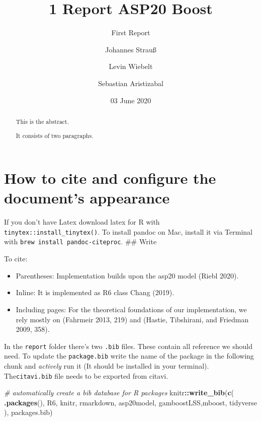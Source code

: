 \documentclass[
]{report}
\title{1 Report ASP20 Boost}
\subtitle{First Report}
\author{Johannes Strauß \and Levin Wiebelt \and Sebastian Aristizabal}
\date{03 June 2020}
\newenvironment{Shaded}{\begin{snugshade}}{\end{snugshade}}
\newcommand{\CommentTok}[1]{\textcolor[rgb]{0.56,0.35,0.01}{\textit{#1}}}
\newcommand{\KeywordTok}[1]{\textcolor[rgb]{0.13,0.29,0.53}{\textbf{#1}}}
\newcommand{\NormalTok}[1]{#1}
\newcommand{\OperatorTok}[1]{\textcolor[rgb]{0.81,0.36,0.00}{\textbf{#1}}}
\newcommand{\StringTok}[1]{\textcolor[rgb]{0.31,0.60,0.02}{#1}}
\providecommand{\tightlist}{%
  \setlength{\itemsep}{0pt}\setlength{\parskip}{0pt}}
\begin{document}
\maketitle
\begin{abstract}
This is the abstract.

It consists of two paragraphs.
\end{abstract}

{
\setcounter{tocdepth}{1}
\tableofcontents
}
\hypertarget{how-to-cite-and-configure-the-documents-appearance}{%
\chapter{How to cite and configure the document's
appearance}\label{how-to-cite-and-configure-the-documents-appearance}}

If you don't have Latex download latex for R with
\texttt{tinytex::install\_tinytex()}. To install pandoc on Mac, install
it via Terminal with \texttt{brew\ install\ pandoc-citeproc}. \#\# Write

To cite:

\begin{itemize}
\tightlist
\item
  Parentheses: Implementation builds upon the asp20 model (Riebl 2020).
\item
  Inline: It is implemented as R6 class Chang (2019).
\item
  Including pages: For the theoretical foundations of our
  implementation, we rely mostly on (Fahrmeir 2013, 219) and (Hastie,
  Tibshirani, and Friedman 2009, 358).
\end{itemize}

In the \texttt{report} folder there's two \texttt{.bib} files. These
contain all reference we should need. To update the \texttt{package.bib}
write the name of the package in the following chunk and \emph{actively}
run it (It should be installed in your terminal). The\texttt{citavi.bib}
file needs to be exported from citavi.

\begin{Shaded}
\begin{Highlighting}[]
\CommentTok{\# automatically create a bib database for R packages}
\NormalTok{knitr}\OperatorTok{::}\KeywordTok{write\_bib}\NormalTok{(}\KeywordTok{c}\NormalTok{(}
  \KeywordTok{.packages}\NormalTok{(), }\StringTok{\textquotesingle{}R6\textquotesingle{}}\NormalTok{, }\StringTok{\textquotesingle{}knitr\textquotesingle{}}\NormalTok{, }\StringTok{\textquotesingle{}rmarkdown\textquotesingle{}}\NormalTok{, }\StringTok{\textquotesingle{}asp20model\textquotesingle{}}\NormalTok{, }\StringTok{\textquotesingle{}gamboostLSS\textquotesingle{}}\NormalTok{,}\StringTok{\textquotesingle{}mboost\textquotesingle{}}\NormalTok{, }\StringTok{\textquotesingle{}tidyverse\textquotesingle{}}  
\NormalTok{), }\StringTok{\textquotesingle{}packages.bib\textquotesingle{}}\NormalTok{)}
\end{Highlighting}
\end{Shaded}
\end{document}
